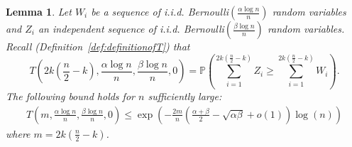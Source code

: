 \documentclass[english]{article}
\newtheorem{lemma}{Lemma}
\newcommand{\1}{\textbf{1}}
\newcommand{\p}{\mathbb{P}}
\begin{document}
\begin{lemma}\label{lemma:pnk_fromCLT_ITub} 
Let $W_i$ be a sequence of i.i.d. Bernoulli$\left(\frac{\alpha \log n}n \right)$ random variables and $Z_i$ an independent sequence of i.i.d. Bernoulli$\left(\frac{\beta \log n}n \right)$ random variables. Recall (Definition~\ref{def:definitionofT}) that
\[
T\left( 2k\left(\frac{n}2-k\right),\frac{\alpha\log n}{n},\frac{\beta\log n}{n},0\right) = \p\left( \sum_{i=1}^{2k\left(\frac{n}2-k\right)}Z_i \geq \sum_{i=1}^{2k\left(\frac{n}2-k\right)}W_i  \right).
\]
The following bound holds for $n$ sufficiently large:
\begin{align}
T\left( m,\frac{\alpha\log n}{n},\frac{\beta\log n}{n},0\right)  \leq \exp \left(-\frac{2m}{n} \left( \frac{\alpha+\beta}{2} -\sqrt{\alpha \beta} + o(1)\right) \log(n)\right)
\end{align}
where $m=2k \left( \frac{n}{2}-k\right)$.
\end{lemma}
\end{document}
